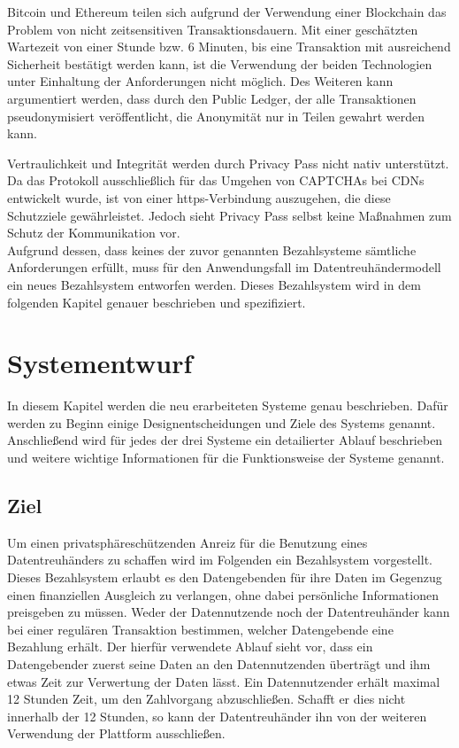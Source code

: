 \documentclass{scrreprt}
\begin{document}
Bitcoin und Ethereum teilen sich aufgrund der Verwendung einer Blockchain das Problem von nicht zeitsensitiven Transaktionsdauern. Mit einer geschätzten Wartezeit von einer Stunde bzw. 6 Minuten, bis eine Transaktion mit ausreichend Sicherheit bestätigt werden kann, ist die Verwendung der beiden Technologien unter Einhaltung der Anforderungen nicht möglich. Des Weiteren kann argumentiert werden, dass durch den Public Ledger, der alle Transaktionen pseudonymisiert veröffentlicht, die Anonymität nur in Teilen gewahrt werden kann. 

Vertraulichkeit und Integrität werden durch Privacy Pass nicht nativ unterstützt. Da das Protokoll ausschließlich für das Umgehen von CAPTCHAs bei CDNs entwickelt wurde, ist von einer https-Verbindung auszugehen, die diese Schutzziele gewährleistet. Jedoch sieht Privacy Pass selbst keine Maßnahmen zum Schutz der Kommunikation vor.\\

Aufgrund dessen, dass keines der zuvor genannten Bezahlsysteme sämtliche Anforderungen erfüllt, muss für den Anwendungsfall im Datentreuhändermodell ein neues Bezahlsystem entworfen werden. Dieses Bezahlsystem wird in dem folgenden Kapitel genauer beschrieben und spezifiziert. 





\chapter{Systementwurf}
\label{chap:systems}

In diesem Kapitel werden die neu erarbeiteten Systeme genau beschrieben. Dafür werden zu Beginn einige Designentscheidungen und Ziele des Systems genannt. Anschließend wird für jedes der drei Systeme ein detailierter Ablauf beschrieben und weitere wichtige Informationen für die Funktionsweise der Systeme genannt.

\section{Ziel}
\label{sec:mainPart_ziel}
Um einen privatsphäreschützenden Anreiz für die Benutzung eines Datentreuhänders zu schaffen wird im Folgenden ein Bezahlsystem vorgestellt. Dieses Bezahlsystem erlaubt es den Datengebenden für ihre Daten im Gegenzug einen finanziellen Ausgleich zu verlangen, ohne dabei persönliche Informationen preisgeben zu müssen. Weder der Datennutzende noch der Datentreuhänder kann bei einer regulären Transaktion bestimmen, welcher Datengebende eine Bezahlung erhält. Der hierfür verwendete Ablauf sieht vor, dass ein Datengebender zuerst seine Daten an den Datennutzenden überträgt und ihm etwas Zeit zur Verwertung der Daten lässt. Ein Datennutzender erhält maximal 12 Stunden Zeit, um den Zahlvorgang abzuschließen. Schafft er dies nicht innerhalb der 12 Stunden, so kann der Datentreuhänder ihn von der weiteren Verwendung der Plattform ausschließen. 
\end{document}

